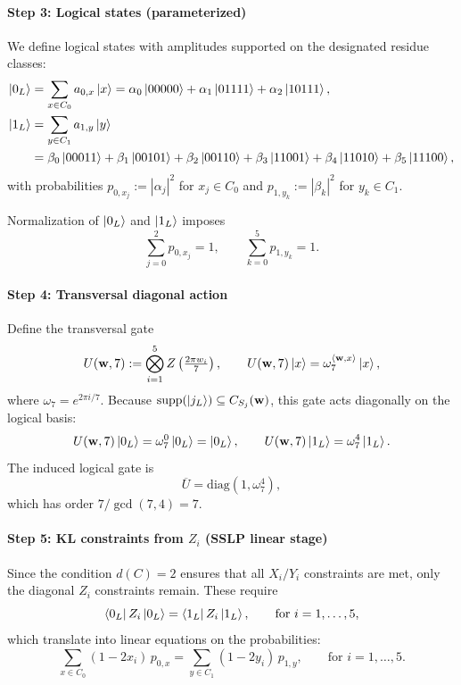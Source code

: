 \documentclass[pdflatex,sn-nature]{sn-jnl}%
\theoremstyle{thmstyleone}%
\theoremstyle{thmstyletwo}%
\theoremstyle{thmstylethree}%
\begin{document}
\begin{appendices}
\paragraph{Step 3: Logical states (parameterized)}

We define logical states with amplitudes supported on the designated residue classes:
\begin{align}
    \ket{0_L} &= \sum_{x\in C_0} a_{0,x}\ket{x}
               = \alpha_0\ket{00000}+\alpha_1\ket{01111}+\alpha_2\ket{10111},\\
    \ket{1_L} &= \sum_{y\in C_1} a_{1,y}\ket{y} \notag\\
              &= \beta_0\ket{00011}+\beta_1\ket{00101}+\beta_2\ket{00110}
               +\beta_3\ket{11001}+\beta_4\ket{11010}+\beta_5\ket{11100}, \notag
\end{align}
with probabilities $p_{0,x_j}:=|\alpha_j|^2$ for $x_j \in C_0$ and $p_{1,y_k}:=|\beta_k|^2$ for $y_k \in C_1$.

Normalization of $\ket{0_L}$ and $\ket{1_L}$ imposes
\[
    \sum_{j=0}^{2}p_{0, x_{j}}=1,\qquad
    \sum_{k=0}^{5}p_{1, y_{k}}=1.
\]

\paragraph{Step 4: Transversal diagonal action}

Define the transversal gate
\[
    U(\mathbf w,7):=\bigotimes_{i=1}^5 Z \left(\tfrac{2\pi w_i}{7}\right),\qquad
    U(\mathbf w,7)\ket{x}=\omega_7^{\langle\mathbf w,x\rangle}\ket{x},
\]
where $\omega_7=e^{2\pi i/7}$. Because $\mathrm{supp}(\ket{j_L})\subseteq C_{S_j}(\mathbf w)$, this gate acts diagonally on the logical basis:
\[
    U(\mathbf w,7)\ket{0_L}=\omega_7^{0}\ket{0_L}=\ket{0_L},\qquad
    U(\mathbf w,7)\ket{1_L}=\omega_7^{4}\ket{1_L}.
\]
The induced logical gate is
\[
    \overline U=\mathrm{diag}(1, \omega_7^{4}),
\]
which has order $7/\gcd(7,4)=7$.

\paragraph{Step 5: KL constraints from $Z_i$ (SSLP linear stage)}

Since the condition $d(C)=2$ ensures that all $X_i/Y_i$ constraints are met, only the diagonal $Z_i$ constraints remain. These require
\[
    \bra{0_L}Z_i\ket{0_L}=\bra{1_L}Z_i\ket{1_L},\qquad \text{for } i=1,\dots,5,
\]
which translate into linear equations on the probabilities:
\[
    \sum_{x\in C_0}(1-2x_i)\, p_{0,x}
    =\sum_{y\in C_1}(1-2y_i)\, p_{1,y} ,\qquad \text{for } i=1,\dots,5.
\]


\end{appendices}
\end{document}
